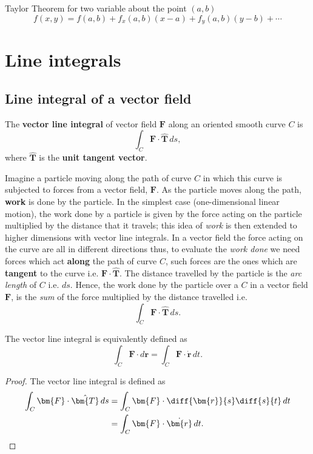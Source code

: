 \documentclass[12pt, a4paper]{article}
\begin{document}
\begin{mdthm}
    Taylor Theorem for two variable about the point \((a,b)\)
    \[f(x,y)= f(a,b)+f_x(a,b)(x-a)+f_y(a,b)(y-b)+\cdots \]
\end{mdthm}

\section{Line integrals}

\subsection{Line integral of a vector field}

\begin{definition}
    The \textbf{vector line integral} of vector field \(\bm{F}\) along an oriented smooth curve \(C\) is
    \[\int_C \bm{F} \cdot \hat{\bm{T}} \, ds,\]
    where \(\hat{\bm{T}}\) is the \textbf{unit tangent vector}.
\end{definition}

\begin{mdnote}
    Imagine a particle moving along the path of curve \(C\) in which this curve is subjected to forces from a vector field, \(\bm{F}\). As the particle moves along the path, \textbf{work} is done by the particle. In the simplest case (one-dimensional linear motion), the work done by a particle is given by the force acting on the particle multiplied by the distance that it travels; this idea of \textit{work} is then extended to higher dimensions with vector line integrals. In a vector field the force acting on the curve are all in different directions thus, to evaluate the \textit{work done} we need forces which act \textbf{along} the path of curve \(C\), such forces are the ones which are \textbf{tangent} to the curve i.e. \(\bm{F} \cdot \hat{\bm{T}}\). The distance travelled by the particle is the \textit{arc length} of \(C\) i.e. \(ds\). Hence, the work done by the particle over a \(C\) in a vector field \(\bm{F}\), is the \textit{sum} of the force multiplied by the distance travelled i.e.
    \[\int_C \bm{F} \cdot \hat{\bm{T}} \, ds.\]
\end{mdnote}

\begin{mdthm}
    The vector line integral is equivalently defined as
    \[\int_C \bm{F} \cdot d\bm{r} = \int_C \bm{F} \cdot \dot{\bm{r}} \, dt.\]
\end{mdthm}

\begin{proof}
    The vector line integral is defined as 
    \[\begin{aligned}
        \int_C \bm{F} \cdot \hat{\bm{T}} \, ds &= \int_C \bm{F} \cdot \diff{\bm{r}}{s} \diff{s}{t} \, dt\\
        &= \int_C \bm{F} \cdot \dot{\bm{r}} \, dt.
    \end{aligned}\]
\end{proof}
\end{document}

